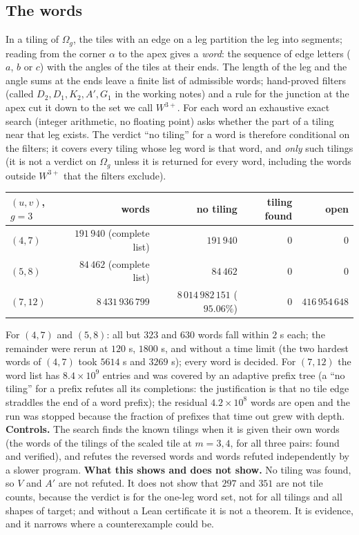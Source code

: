 \documentclass[11pt,reqno]{amsart}
\theoremstyle{plain}
\theoremstyle{definition}
\begin{document}
\subsection{The words}
In a tiling of $\Omega_g$, the tiles with an edge on a leg partition the leg into segments; reading from the corner $\alpha$ to the apex gives a \emph{word}: the sequence of edge letters ($a$, $b$ or $c$) with the angles of the tiles at their ends.
The length of the leg and the angle sums at the ends leave a finite list of admissible words; hand-proved filters (called $D_2,D_1,K_2,A',G_1$ in the working notes) and a rule for the junction at the apex cut it down to the set we call \emph{$W^{3+}$}.
For each word an exhaustive exact search (integer arithmetic, no floating point) asks whether the part of a tiling near that leg exists.
The verdict ``no tiling'' for a word is therefore conditional on the filters; it covers every tiling whose leg word is that word, and \emph{only} such tilings (it is not a verdict on $\Omega_g$ unless it is returned for every word, including the words outside $W^{3+}$ that the filters exclude).
\begin{center}\small
\begin{tabular}{@{}lrrrr@{}}
\toprule
$(u,v)$, $g=3$ & words & no tiling & tiling found & open\\
\midrule
$(4,7)$ & $191\,940$ (complete list) & $191\,940$ & $0$ & $0$\\
$(5,8)$ & $84\,462$ (complete list) & $84\,462$ & $0$ & $0$\\
$(7,12)$ & $8\,431\,936\,799$ & $8\,014\,982\,151$ ($95.06\%$) & $0$ & $416\,954\,648$\\
\bottomrule
\end{tabular}
\end{center}
For $(4,7)$ and $(5,8)$: all but $323$ and $630$ words fall within $2$ s each; the remainder were rerun at $120$ s, $1800$ s, and without a time limit (the two hardest words of $(4,7)$ took $5614$ s and $3269$ s); every word is decided.
For $(7,12)$ the word list has $8.4\times10^9$ entries and was covered by an adaptive prefix tree (a ``no tiling'' for a prefix refutes all its completions: the justification is that no tile edge straddles the end of a word prefix); the residual $4.2\times10^8$ words are open and the run was stopped because the fraction of prefixes that time out grew with depth.
\textbf{Controls.} The search finds the known tilings when it is given their own words (the words of the tilings of the scaled tile at $m=3,4$, for all three pairs: found and verified), and refutes the reversed words and words refuted independently by a slower program.
\textbf{What this shows and does not show.} No tiling was found, so $V$ and $A'$ are not refuted. It does not show that $297$ and $351$ are not tile counts, because the verdict is for the one-leg word set, not for all tilings and all shapes of target; and without a Lean certificate it is not a theorem. It is evidence, and it narrows where a counterexample could be.
\end{document}
